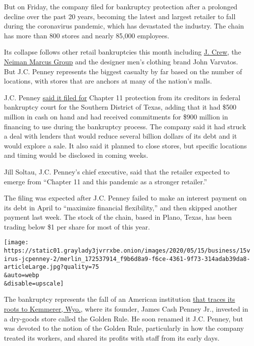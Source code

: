 But on Friday, the company filed for bankruptcy protection after a
prolonged decline over the past 20 years, becoming the latest and
largest retailer to fall during the coronavirus pandemic, which has
devastated the industry. The chain has more than 800 stores and nearly
85,000 employees.

Its collapse follows other retail bankruptcies this month including
\href{https://www.nytimes3xbfgragh.onion/2020/05/03/business/j-crew-bankruptcy-coronavirus.html}{J.
Crew}, the
\href{https://www.nytimes3xbfgragh.onion/2020/05/07/business/neiman-marcus-bankruptcy.html}{Neiman
Marcus Group} and the designer men's clothing brand John Varvatos. But
J.C. Penney represents the biggest casualty by far based on the number
of locations, with stores that are anchors at many of the nation's
malls.

J.C. Penney
\href{https://ir.jcpenney.com/news-events/press-releases/detail/613/jcpenney-to-reduce-debt-and-strengthen-financial-position}{said
it filed for} Chapter 11 protection from its creditors in federal
bankruptcy court for the Southern District of Texas, adding that it had
\$500 million in cash on hand and had received commitments for \$900
million in financing to use during the bankruptcy process. The company
said it had struck a deal with lenders that would reduce several billion
dollars of its debt and it would explore a sale. It also said it planned
to close stores, but specific locations and timing would be disclosed in
coming weeks.

Jill Soltau, J.C. Penney's chief executive, said that the retailer
expected to emerge from ``Chapter 11 and this pandemic as a stronger
retailer.''

The filing was expected after J.C. Penney failed to make an interest
payment on its debt in April to ``maximize financial flexibility,'' and
then skipped another payment last week. The stock of the chain, based in
Plano, Texas, has been trading below \$1 per share for most of this
year.

\texttt{[image: https://static01.graylady3jvrrxbe.onion/images/2020/05/15/business/15virus-jcpenney-2/merlin\_172537914\_f9b6d8a9-f6ce-4361-9f73-314adab39da8-articleLarge.jpg?quality=75\\\&auto=webp\\\&disable=upscale]}

The bankruptcy represents the fall of an American institution
\href{https://www.nytimes3xbfgragh.onion/1971/02/13/archives/j-c-penney-of-store-chain-dies-built-business-on-golden-rule-j-c.html}{that
traces its roots to Kemmerer, Wyo.}, where its founder, James Cash
Penney Jr., invested in a dry-goods store called the Golden Rule. He
soon renamed it J.C. Penney, but was devoted to the notion of the Golden
Rule, particularly in how the company treated its workers, and shared
its profits with staff from its early days.

